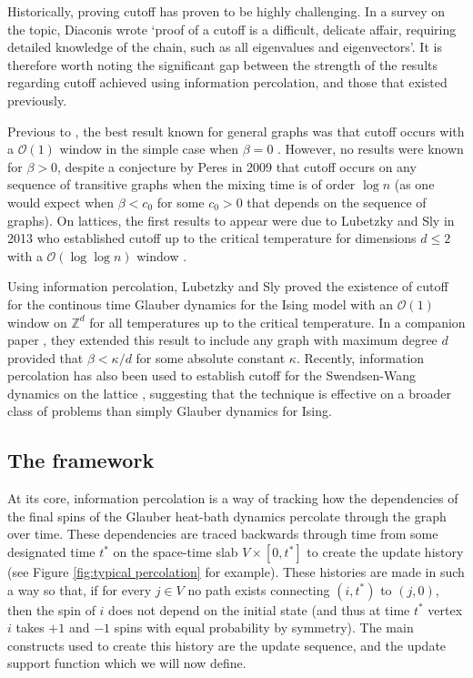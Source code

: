 	Historically, proving cutoff has proven to be highly challenging. In a survey on the topic, Diaconis \cite{Diaconis1996-sz} wrote `proof of a cutoff is a difficult, delicate affair, requiring detailed knowledge of the chain, such as all eigenvalues and eigenvectors'. It is therefore worth noting the significant gap between the strength of the results regarding cutoff achieved using information percolation, and those that existed previously.

	Previous to \cite{Lubetzky2016-wd}, the best result known for general graphs was that cutoff occurs with a $\mathcal{O}(1)$ window in the simple case when $\beta = 0$ \cite{Aldous1983-gz}. However, no results were known for $\beta > 0$, despite a conjecture by Peres in 2009 \cite[Section 23.2]{Levin2009-fo} that cutoff occurs on any sequence of transitive graphs when the mixing time is of order $\log n$ (as one would expect when $\beta < c_0$ for some $c_0 > 0$ that depends on the sequence of graphs). On lattices, the first results to appear were due to Lubetzky and Sly in 2013 who established cutoff up to the critical temperature for dimensions $d \leq 2$ with a $\mathcal{O}(\log \log n)$ window \cite{Lubetzky2013-yv}. 

	Using information percolation, Lubetzky and Sly proved the existence of cutoff for the continous time Glauber dynamics for the Ising model with an $\mathcal{O}(1)$ window on $\mathbb{Z}^d$ for all temperatures up to the critical temperature. In a companion paper \cite{Lubetzky2017-nc}, they extended this result to include any graph with maximum degree $d$ provided that $\beta < \kappa/d$ for some absolute constant $\kappa$. Recently, information percolation has also been used to establish cutoff for the Swendsen-Wang dynamics on the lattice \cite{Nam2018-io}, suggesting that the technique is effective on a broader class of problems than simply Glauber dynamics for Ising.
	
	\subsection{The framework}
	At its core, information percolation is a way of tracking how the dependencies of the final spins of the Glauber heat-bath dynamics percolate through the graph over time. These dependencies are traced backwards through time from some designated time $t^*$ on the space-time slab $V \times [0, t^*]$ to create the update history (see Figure \ref{fig:typical percolation} for example). These histories are made in such a way so that, if for every $j \in V$ no path exists connecting $(i, t^*)$ to $(j, 0)$, then the spin of $i$ does not depend on the initial state (and thus at time $t^*$ vertex $i$ takes $+1$ and $-1$ spins with equal probability by symmetry). The main constructs used to create this history are the update sequence, and the update support function which we will now define.

